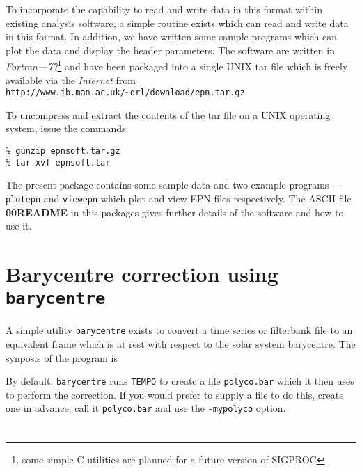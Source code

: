 \documentclass[11pt]{article}
\begin{document}
To incorporate the capability to read and write data in this format
within existing analysis software, a simple routine exists which can
read and write data in this format. In addition, we have written some
sample programs which can plot the data and display the header
parameters.  The software are written in 
{\it Fortran---77}\footnote{some simple C utilities are planned for
a future version of SIGPROC} and have
been packaged into a single UNIX tar file which is freely available
via the {\it Internet} from 
\verb+http://www.jb.man.ac.uk/~drl/download/epn.tar.gz+

To uncompress and extract the contents of the tar file on a UNIX
operating system, issue the commands:

\begin{verbatim}
% gunzip epnsoft.tar.gz
% tar xvf epnsoft.tar
\end{verbatim}

\noindent
The present package contains some sample data and two example programs ---
{\tt plotepn} and {\tt viewepn} which plot and view EPN files respectively.
The ASCII file {\bf 00README} in this packages gives further details of the 
software and how to use it.

\section{Barycentre correction using {\tt barycentre}}

A simple utility \verb+barycentre+ exists to convert a time
series or filterbank file to an equivalent frame which is
at rest with respect to the solar system barycentre.
The synposis of the program is


By default, {\tt barycentre} runs {\tt TEMPO} to create a file
{\tt polyco.bar} which it then uses to perform the correction.
If you would prefer to supply a file to do this, create one in
advance, call it {\tt polyco.bar} and use the {\tt -mypolyco} option. 

%
%
%
%


\section*{}
\printindex
{}
\end{document}
